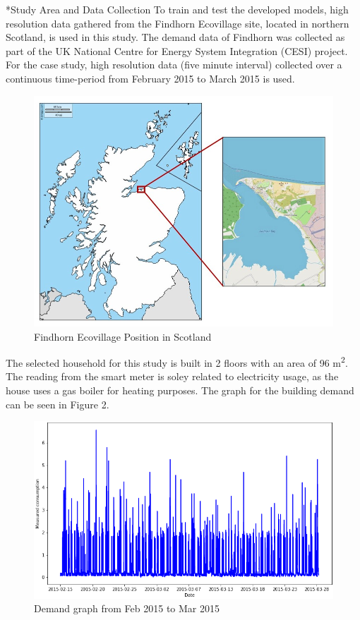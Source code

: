 \documentclass[twocolumn, a4paper,10pt]{article}
\makeatletter
\renewcommand\section{\@startsection{section}{1}{\z@}{0.25cm}{0.1cm}{\normalfont\large\bfseries}}
\makeatother
\begin{document}
\section*{Study Area and Data Collection}
To train and test the developed models, high resolution data gathered from the Findhorn Ecovillage site, located in northern Scotland, is used in this study. The demand data of Findhorn was collected as part of the UK National Centre for Energy System Integration (CESI) project. For the case study, high resolution data (five minute interval) collected over a continuous time-period from February 2015 to March 2015 is used.

\begin{figure}[ht]
    \centering
    \includegraphics[scale=0.3]{img/Finhorn_Postion.jpg}
    \caption{Findhorn Ecovillage Position in Scotland}
    \label{fig:Finhorn_Postion}
\end{figure}

The selected household for this study is built in 2 floors with an area of 96 m\textsuperscript{2}. The reading from the smart meter is soley related to electricity usage, as the house uses a gas boiler for heating purposes. The graph for the building demand can be seen in Figure 2.

\begin{figure}[ht]
    \centering
    \includegraphics[scale=0.3]{img/edp_graph.png}
    \caption{Demand graph from Feb 2015 to Mar 2015}
    \label{fig:edp_graph}
\end{figure}
\end{document}
